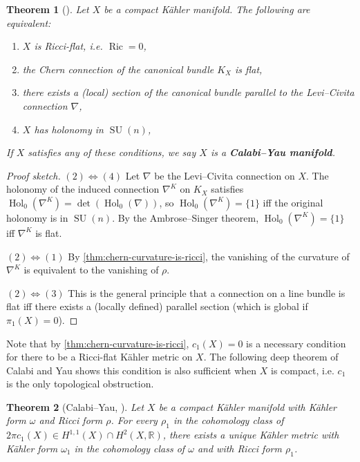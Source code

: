 \documentclass{report}
\theoremstyle{plain}
\newtheorem{theorem}{Theorem}[section]
\theoremstyle{definition}
\theoremstyle{remark}
\newcommand{\bR}{\mathbb{R}}
\DeclareMathOperator{\SU}{SU}
\DeclareMathOperator{\Ric}{Ric}
\DeclareMathOperator{\Hol}{Hol}
\begin{document}
\begin{theorem}[{\cite[Theorem 17.5]{Moroianu2007}}] \label{def:calabi-yau}
  Let $X$ be a compact K\"ahler manifold. The following are
  equivalent:
  \begin{enumerate}
  \item $X$ is Ricci-flat, i.e. $\Ric = 0$,
  \item the Chern connection of the canonical bundle $K_X$ is flat,
  \item there exists a (local) section of the canonical bundle
    parallel to the Levi--Civita connection $\nabla$,
  \item $X$ has holonomy in $\SU(n)$,
  \end{enumerate}
  If $X$ satisfies any of these conditions, we say $X$ is a {\bf
    Calabi--Yau manifold}.
\end{theorem}

\begin{proof}[Proof sketch]
  $(2) \iff (4)$ Let $\nabla$ be the Levi--Civita connection on
  $X$. The holonomy of the induced connection $\nabla^K$ on $K_X$
  satisfies $\Hol_0(\nabla^K) = \det(\Hol_0(\nabla))$, so
  $\Hol_0(\nabla^K) = \{1\}$ iff the original holonomy is in $\SU(n)$.
  By the Ambrose--Singer theorem, $\Hol_0(\nabla^K) = \{1\}$ iff
  $\nabla^K$ is flat.

  $(2) \iff (1)$ By \ref{thm:chern-curvature-is-ricci}, the vanishing
  of the curvature of $\nabla^K$ is equivalent to the vanishing of
  $\rho$.

  $(2) \iff (3)$ This is the general principle that a connection on a
  line bundle is flat iff there exists a (locally defined) parallel
  section (which is global if $\pi_1(X) = 0$).
\end{proof}

Note that by \ref{thm:chern-curvature-is-ricci}, $c_1(X) = 0$ is a
necessary condition for there to be a Ricci-flat K\"ahler metric on
$X$. The following deep theorem of Calabi and Yau shows this condition
is also sufficient when $X$ is compact, i.e. $c_1$ is the only
topological obstruction.

\begin{theorem}[Calabi--Yau, {\cite[Theorem 18.1]{Moroianu2007}}]
  Let $X$ be a compact K\"ahler manifold with K\"ahler form $\omega$
  and Ricci form $\rho$. For every $\rho_1$ in the cohomology class of
  $2\pi c_1(X) \in H^{1,1}(X) \cap H^2(X, \bR)$, there exists a unique
  K\"ahler metric with K\"ahler form $\omega_1$ in the cohomology
  class of $\omega$ and with Ricci form $\rho_1$.
\end{theorem}
\end{document}
